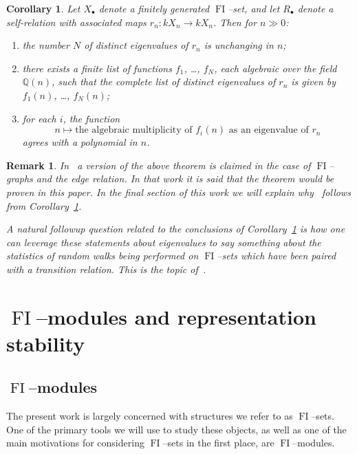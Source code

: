 \documentclass[10pt]{amsart}
\DeclareMathOperator{\FI}{FI}
\newcommand{\Q}{\mathbb{Q}}
\newcommand{\dt}{\bullet}
\newtheorem{corab}[theorem]{Corollary}
\newtheorem{remark}[theorem]{Remark}
\theoremstyle{definition}
\begin{document}
\begin{corab}\label{maincor}
Let $X_\dt$ denote a finitely generated $\FI$--set, and let $R_\dt$ denote a self-relation with associated maps $r_n:k X_n \rightarrow k X_n$. Then for $n \gg 0$:
\begin{enumerate}
\item\label{coro1.6_1} the number $N$ of distinct eigenvalues of $r_n$ is unchanging in $n$;
\item\label{coro1.6_2} there exists a finite list of functions $f_1$, \dots, $f_N$, each algebraic over the field $\Q(n)$, such that the complete list of distinct eigenvalues of $r_n$ is given by $f_1(n)$, \dots, $f_N(n)$;
\item\label{coro1.6_3} for each $i$, the function
\[
n \mapsto \text{the algebraic multiplicity of $f_i(n)$ as an eigenvalue of $r_n$}
\]
agrees with a polynomial in $n$.
\end{enumerate}
\end{corab}

\begin{remark}
In~\cite[Theorem~H]{RW} a version of the above theorem is claimed in the case of $\FI$--graphs and the edge relation. In that work it is said that the theorem would be proven in this paper. In the final section of this work we will explain why~\cite[Theorem~H]{RW} follows from Corollary~\ref{maincor}.

A natural followup question related to the conclusions of Corollary~\ref{maincor} is how one can leverage these statements about eigenvalues to say something about the statistics of random walks being performed on $\FI$--sets which have been paired with a transition relation. This is the topic of~\cite{RW2}.
\end{remark}


\section{\texorpdfstring{$\FI$}{FI}--modules and representation stability}

\subsection{\texorpdfstring{$\FI$}{FI}--modules}
The present work is largely concerned with structures we refer to as $\FI$--sets. One of the primary tools we will use to study these objects, as well as one of the main motivations for considering $\FI$--sets in the first place, are $\FI$--modules.
\end{document}
